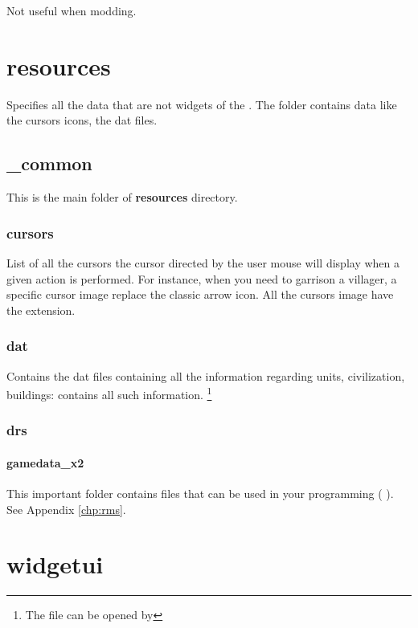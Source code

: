 \begin{appendices}
    Not useful when modding.

    \section{resources}

    Specifies all the data that are not widgets of the . The folder contains data like the cursors icons, the \genie{} dat files.

    \subsection{\_common}

    This is the main folder of \textbf{resources} directory.

    \subsubsection{cursors}

    List of all the cursors the cursor directed by the user mouse will display when a given action is performed. For instance, when you need to garrison a villager, a specific cursor image replace the classic arrow icon. All the cursors image have the  extension.

    \subsubsection{dat}

    Contains the dat files containing all the information regarding units, civilization, buildings:  contains all such information. \footnote{The file can be opened by \genie{}}

    \subsubsection{drs}

    \paragraph{gamedata\_x2}

    This important folder contains  files that can be used in your  programming (\eg{} ). See Appendix \ref{chp:rms}.

    \section{widgetui}


\end{appendices}
